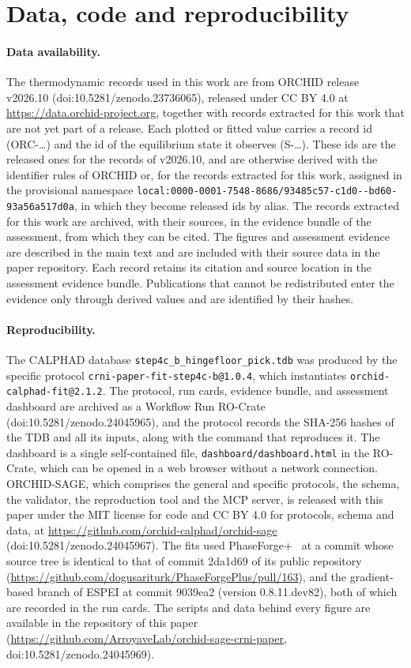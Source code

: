 \section*{Data, code and reproducibility}

\paragraph{Data availability.}
The thermodynamic records used in this work are from ORCHID release v2026.10 (doi:10.5281/zenodo.23736065), released under CC BY 4.0 at \url{https://data.orchid-project.org}, together with records extracted for this work that are not yet part of a release. Each plotted or fitted value carries a record id (ORC-\ldots) and the id of the equilibrium state it observes (S-\ldots). These ids are the released ones for the records of v2026.10, and are otherwise derived with the identifier rules of ORCHID or, for the records extracted for this work, assigned in the provisional namespace \texttt{local:0000-0001-7548-8686/\allowbreak 93485c57-\allowbreak c1d0--\allowbreak bd60-\allowbreak 93a56a517d0a}, in which they become released ids by alias. The records extracted for this work are archived, with their sources, in the evidence bundle of the assessment, from which they can be cited. The figures and assessment evidence are described in the main text and are included with their source data in the paper repository. Each record retains its citation and source location in the assessment evidence bundle. Publications that cannot be redistributed enter the evidence only through derived values and are identified by their hashes.

\paragraph{Reproducibility.}
The CALPHAD database \texttt{step4c\_b\_hingefloor\_pick.tdb} was produced by the specific protocol \texttt{crni-paper-fit-step4c-b@1.0.4}, which instantiates \texttt{orchid-calphad-fit@2.1.2}. The protocol, run cards, evidence bundle, and assessment dashboard are archived as a Workflow Run RO-Crate (doi:10.5281/zenodo.24045965), and the protocol records the SHA-256 hashes of the TDB and all its inputs, along with the command that reproduces it. The dashboard is a single self-contained file, \texttt{dashboard/dashboard.html} in the RO-Crate, which can be opened in a web browser without a network connection. ORCHID-SAGE, which comprises the general and specific protocols, the schema, the validator, the reproduction tool and the MCP server, is released with this paper under the MIT license for code and CC BY 4.0 for protocols, schema and data, at \url{https://github.com/orchid-calphad/orchid-sage} (doi:10.5281/zenodo.24045967). The fits used PhaseForge+~\cite{sariturk2025phaseforgeplus} at a commit whose source tree is identical to that of commit 2da1d69 of its public repository (\url{https://github.com/dogusariturk/PhaseForgePlus/pull/163}), and the gradient-based branch of ESPEI at commit 9039ea2 (version 0.8.11.dev82), both of which are recorded in the run cards. The scripts and data behind every figure are available in the repository of this paper (\url{https://github.com/ArroyaveLab/orchid-sage-crni-paper}, doi:10.5281/zenodo.24045969).
